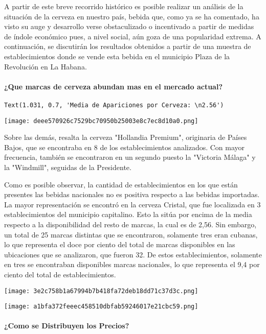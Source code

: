 A partir de este breve recorrido histórico es posible realizar un
análisis de la situación de la cerveza en nuestro país, bebida que, como
ya se ha comentado, ha visto su auge y desarrollo verse obstaculizado o
incentivado a partir de medidas de índole económico pues, a nivel
social, aún goza de una popularidad extrema. A continuación, se
discutirán los resultados obtenidos a partir de una muestra de
establecimientos donde se vende esta bebida en el municipio Plaza de la
Revolución en La Habana.

\hypertarget{que-marcas-de-cerveza-abundan-mas-en-el-mercado-actual}{%
\paragraph{¿Que marcas de cerveza abundan mas en el mercado
actual?}\label{que-marcas-de-cerveza-abundan-mas-en-el-mercado-actual}}

\begin{verbatim}
Text(1.031, 0.7, 'Media de Apariciones por Cerveza: \n2.56')
\end{verbatim}

\texttt{[image: deee570926c7529bc70950b25003e8c7ec8d10a0.png]}

Sobre las demás, resalta la cerveza "Hollandia Premium", originaria de
Países Bajos, que se encontraba en 8 de los establecimientos analizados.
Con mayor frecuencia, también se encontraron en un segundo puesto la
"Victoria Málaga" y la "Windmill", seguidas de la Presidente.

Como es posible observar, la cantidad de establecimientos en los que
están presentes las bebidas nacionales no es positiva respecto a las
bebidas importadas. La mayor representación se encontró en la cerveza
Cristal, que fue localizada en 3 establecimientos del municipio
capitalino. Esto la sitúa por encima de la media respecto a la
disponibilidad del resto de marcas, la cual es de 2,56. Sin embargo, un
total de 25 marcas distintas que se encontraron, solamente tres eran
cubanas, lo que representa el doce por ciento del total de marcas
disponibles en las ubicaciones que se analizaron, que fueron 32. De
estos establecimientos, solamente en tres se encontraban disponibles
marcas nacionales, lo que representa el 9,4 por ciento del total de
establecimientos.

\texttt{[image: 3e2c758b1a67994b7b418fa72deb18dd71c37d3c.png]}

\texttt{[image: a1bfa372feeec458510dbfab59246017e21cbc59.png]}

\hypertarget{como-se-distribuyen-los-precios}{%
\paragraph{¿Como se Distribuyen los
Precios?}\label{como-se-distribuyen-los-precios}}

